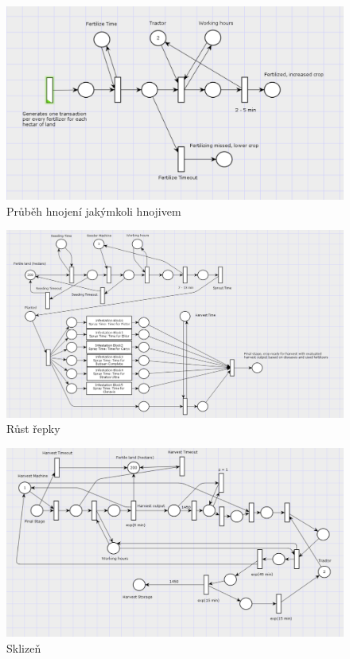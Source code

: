 \documentclass[11pt,a4paper,titlepage]{article}
\begin{document}
\begin{figure}[ht!]
\centering
\includegraphics[scale=0.3]{img/Fertilization.png}
\caption{Průběh hnojení jakýmkoli hnojivem}
\end{figure}

\begin{figure}[ht!]
\centering
\includegraphics[scale=0.25]{img/Growing.png}
\caption{Růst řepky}
\end{figure}

\begin{figure}[ht!]
\centering
\includegraphics[scale=0.25]{img/Harvest.png}
\caption{Sklizeň}
\end{figure}
\end{document}
